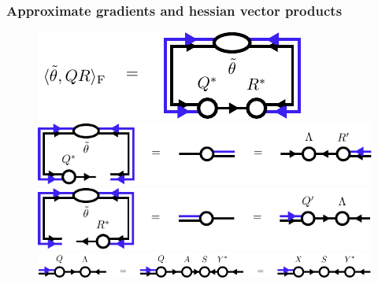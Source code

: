 \subsubsection*{Approximate gradients and hessian vector products}
\begin{figure}
	\centering
	\subcaptionbox{\label{fig:approximate_svd_overlap}}
	{%
		\includegraphics[scale=1]{figures/tikz/disoTPS/approximate_svd/approximate_svd_a.pdf}
	}
	\subcaptionbox{\label{fig:approximate_svd_first_step}}
	{%
		\includegraphics[scale=1]{figures/tikz/disoTPS/approximate_svd/approximate_svd_b.pdf}
	}
	\subcaptionbox{\label{fig:approximate_svd_second_step}}
	{%
		\includegraphics[scale=1]{figures/tikz/disoTPS/approximate_svd/approximate_svd_c.pdf}
	}
	\subcaptionbox{\label{fig:approximate_svd_final_step}}
	{%
		\includegraphics[scale=1]{figures/tikz/disoTPS/approximate_svd/approximate_svd_d.pdf}
	}
	\caption{}
	\label{fig:approximate_qr_decomposition}
\end{figure}
